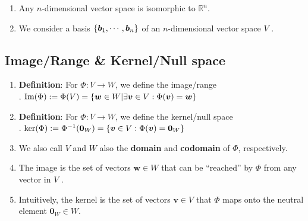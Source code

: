\begin{enumerate}
    \item Any $n$-dimensional vector space is isomorphic to $\mathbb{R}^n$.
    \hfill \cite{mfml/book/mml/Deisenroth-Faisal-Ong}

    \item We consider a basis $\left\{\bm{b}_1, \cdots , \bm{b}_n\right\}$ of an $n$-dimensional vector space $V$ .
    \hfill \cite{mfml/book/mml/Deisenroth-Faisal-Ong}
\end{enumerate}




\subsection{Image/Range \& Kernel/Null space}

\begin{enumerate}
    \item \textbf{Definition}: For $\Phi  : V \to W$, we define the image/range
    \hfill \cite{mfml/book/mml/Deisenroth-Faisal-Ong}
    \\
    .\hfill
    $
        \text{Im}(\Phi ) 
        := \Phi (V ) 
        = \left\{\bm{w} \in W|\exists \bm{v} \in V : \Phi (\bm{v}) = \bm{w}\right\}
    $
    \hfill \cite{mfml/book/mml/Deisenroth-Faisal-Ong}

    \item \textbf{Definition}: For $\Phi  : V \to W$, we define the kernel/null space
    \hfill \cite{mfml/book/mml/Deisenroth-Faisal-Ong}
    \\
    .\hfill
    $
        \ker(\Phi ) 
        := \Phi ^{-1} (\bm{0}_W ) 
        = \left\{\bm{v} \in V : \Phi (\bm{v}) = \bm{0}_W \right\}
    $
    \hfill \cite{mfml/book/mml/Deisenroth-Faisal-Ong}


    \item We also call $V$ and $W$ also the \textbf{domain} and \textbf{codomain} of $\Phi$, respectively.
    \hfill \cite{mfml/book/mml/Deisenroth-Faisal-Ong}

    \item The image is the set of vectors $\bm{w} \in W$ that can be “reached” by $\Phi$ from any vector in $V$ .
    \hfill \cite{mfml/book/mml/Deisenroth-Faisal-Ong}

    \item Intuitively, the kernel is the set of vectors $\bm{v} \in V$ that $\Phi$ maps onto the neutral element $\bm{0}_W \in W$.
    \hfill \cite{mfml/book/mml/Deisenroth-Faisal-Ong}


\end{enumerate}
